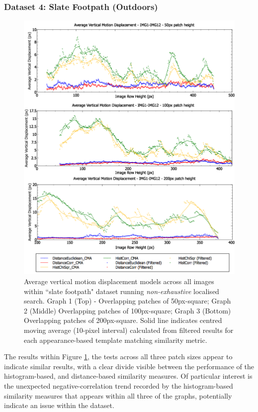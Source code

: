 \clearpage
\subsubsection{Dataset 4: Slate Footpath (Outdoors)}

\begin{figure}[ht!]
\centering
\includegraphics[scale=0.4]{images/results/ex1_results_path_outside_10cm}
\caption{Average vertical motion displacement models across all images within ``slate footpath" dataset running \textit{non-exhaustive} localised search. Graph 1 (Top) - Overlapping patches of 50px-square; Graph 2 (Middle) Overlapping patches of 100px-square; Graph 3 (Bottom) Overlapping patches of 200px-square. Solid line indicates centred moving average (10-pixel interval) calculated from filtered results for each appearance-based template matching similarity metric.}
\label{fig:ex1_1_4}
\end{figure}


The results within Figure \ref{fig:ex1_1_4}, the tests across all three patch sizes appear to indicate similar results, with a clear divide visible between the performance of the histogram-based, and distance-based similarity measures. Of particular interest is the unexpected negative-correlation trend recorded by the histogram-based similarity measures that appears within all three of the graphs, potentially indicate an issue within the dataset.


